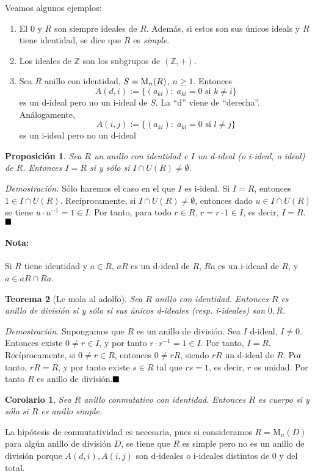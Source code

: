 \documentclass[11pt]{book}
\def\Z{\mathbb{Z}}
\def\qed{\hfill\blacksquare}
\newtheorem{theorem}{Teorema}[section]
\newtheorem{corollary}{Corolario}[theorem]
\newtheorem{prop}[theorem]{Proposición}
\theoremstyle{definition}
\begin{document}
Veamos algunos ejemplos:\begin{enumerate}
    \item El 0 y $R$ son siempre ideales de $R$. Además, si estos son sus únicos ideals y $R$ tiene identidad, se dice que $R$ es \textit{simple}.
    \item Los ideales de $\Z$ son los subgrupos de $(\Z,+)$.
    \item Sea $R$ anillo con identidad, $S=\textrm M_n(R)$, $n\geq 1$. Entonces\[
    A(d,i):=\{(a_{kl}):\; a_{kl}=0\text{ si }k\neq i\}
    \]es un d-ideal pero no un i-ideal de $S$. La ``d'' viene de ``derecha''. Análogamente, \[
    A(i,j):=\{(a_{kl}):\; a_{kl}=0\text{ si }l\neq j\}
    \]es un i-ideal pero no un d-ideal
\end{enumerate}
\begin{prop}
    Sea $R$ un anillo con identidad e $I$ un d-ideal (o i-ideal, o ideal) de $R$. Entonces $I  =R$ si y sólo si $I\cap U(R)\neq \emptyset$.
\end{prop}
\noindent\textit{Demostración.} Sólo haremos el caso en el que $I$ es i-ideal. Si $I=R$, entonces $1\in I\cap U(R)$. Recíprocamente, si $I\cap U(R)\neq \emptyset$, entonces dado $u\in I\cap U(R)$ se tiene $u\cdot u^{-1}=1\in I$. Por tanto, para todo $r\in R$, $r=r\cdot 1\in I$, es decir, $I=R$. $\qed$

\paragraph{Nota:}Si $R$ tiene identidad y $a\in R$, $aR$ es un d-ideal de $R$, $Ra$ es un i-ideaal de $R$, y $a\in aR\cap Ra$.

\begin{theorem}[Le mola al adolfo]
    Sea $R$ anillo con identidad. Entonces $R$ es anillo de división si y sólo si sus únicos d-ideales (resp. i-ideales) son $0,R$.
\end{theorem}
\noindent\textit{Demostración.} Supongamos que $R$ es un anillo de división. Sea $I$ d-ideal, $I\neq 0$. Entonces existe $0\neq r\in I$, y por tanto $r\cdot r^{-1}=1\in I$. Por tanto, $I=R$. Recíprocamente, si $0\neq r\in R$, entonces $0\neq rR$, siendo $rR$ un d-ideal de $R$. Por tanto, $rR=R$, y por tanto existe $s\in R$ tal que $rs=1$, es decir, $r$ es unidad. Por tanto $R$ es anillo de división.$\qed$

\begin{corollary}
    Sea $R$ anillo conmutativo con identidad. Entonces $R$ es cuerpo si y sólo si $R$ es anillo simple.
\end{corollary}
La hipótesis de conmutatividad es necesaria, pues si consideramos $R=\mathrm M_n (D)$ para algún anillo de división $D$, se tiene que $R$ es simple pero no es un anillo de división porque $A(d,i), A(i,j)$ son d-ideales o i-ideales distintos de 0 y del total.
\end{document}
